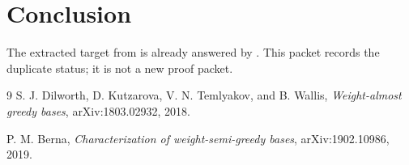 \documentclass[11pt]{article}
\begin{document}
\section*{Conclusion}

The extracted target from \cite{DKTW} is already answered by \cite{Berna}.
This packet records the duplicate status; it is not a new proof packet.

\begin{thebibliography}{9}
S. J. Dilworth, D. Kutzarova, V. N. Temlyakov, and B. Wallis,
\emph{Weight-almost greedy bases},
arXiv:1803.02932, 2018.

P. M. Berna,
\emph{Characterization of weight-semi-greedy bases},
arXiv:1902.10986, 2019.
\end{thebibliography}
\end{document}
